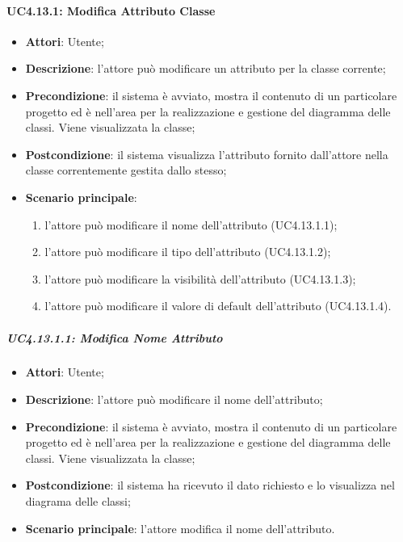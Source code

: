\paragraph{UC4.13.1: Modifica Attributo Classe}
\label{UC4.13.1}
\begin{itemize}
	\item \textbf{Attori}: Utente;
	\item \textbf{Descrizione}: l'attore può modificare un attributo per la classe corrente;
	\item \textbf{Precondizione}:  il sistema è avviato, mostra il contenuto di un particolare progetto ed è nell'area per la realizzazione e gestione del diagramma delle classi. Viene visualizzata la classe;
	\item \textbf{Postcondizione}: il sistema visualizza l'attributo fornito dall'attore nella classe correntemente gestita dallo stesso;
	\item \textbf{Scenario principale}:
	\begin{enumerate}
		\item l'attore può modificare il nome dell'attributo (UC4.13.1.1);
		\item l'attore può modificare il tipo dell'attributo (UC4.13.1.2);
		\item l'attore può modificare la visibilità dell'attributo (UC4.13.1.3);
		\item l'attore può modificare il valore di default dell'attributo (UC4.13.1.4).
	\end{enumerate}
\end{itemize}

\subparagraph{UC4.13.1.1: Modifica Nome Attributo}
\label{UC4.13.1.1}
\begin{itemize}
	\item \textbf{Attori}: Utente;
	\item \textbf{Descrizione}: l'attore può modificare il nome dell'attributo;
	\item \textbf{Precondizione}: il sistema è avviato, mostra il contenuto di un particolare progetto ed è nell'area per la realizzazione e gestione del diagramma delle classi. Viene visualizzata la classe;
	\item \textbf{Postcondizione}: il sistema ha ricevuto il dato richiesto e lo visualizza nel diagrama delle classi;
	\item \textbf{Scenario principale}: l'attore modifica il nome dell'attributo.
\end{itemize}

